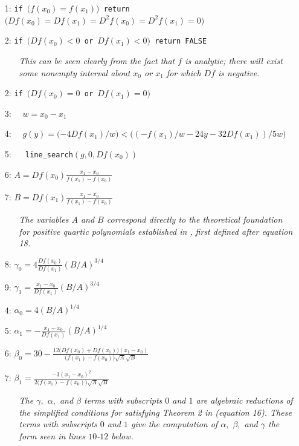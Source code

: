 \documentclass{scspaperproc}
\theoremstyle{scsthe}
\begin{document}
\begin{itemize}
  \itemsep0pt
  \parskip0pt

\item[1:] \texttt{if $\big(f(x_0) = f(x_1)\big)$ return $\big( Df(x_0) = Df(x_1) = D^2f(x_0) = D^2f(x_1) = 0 \big)$}
\item[2:] \texttt{if $\big(Df(x_0) < 0$ or $Df(x_1) < 0\big)$ return FALSE}
  \begin{itemize}
    \item[] \textit{This can be seen clearly from the fact that $f$ is analytic; there will exist some nonempty interval about $x_0$ or $x_1$ for which $Df$ is negative.}
  \end{itemize}


\item[2:] \texttt{if $\big(Df(x_0) = 0$ or $Df(x_1) = 0\big)$}
\item[3:] $\quad w = x_0 - x_1$
\item[4:] $\quad g(y) = \big({-4} Df(x_1) / w \big) < \big( ({-f}(x_1)/w - 24 y - 32 Df(x_1)) / 5w \big)$
\item[5:] $\quad$ \texttt{line\_search}$(g, 0, Df(x_0))$
\item[6:] $A = Df(x_0)\frac{x_1 - x_0}{f(x_1) - f(x_0)}$
\item[7:] $B = Df(x_1) \frac{x_1 - x_0}{f(x_1) - f(x_0)}$
  \begin{itemize}
    \item[] \textit{The variables $A$ and $B$ correspond directly to the theoretical foundation for positive quartic polynomials established in \cite{ulrich1994positivity}, first defined after equation 18.}
  \end{itemize}
\item[8:] $\gamma_0 = 4 \frac{Df(x_0)}{Df(x_1)} (B/A)^{3/4}$
\item[9:] $\gamma_1 = \frac{x_1 - x_0}{Df(x_1)} (B/A)^{3/4}$
\item[4:] $\alpha_0 = 4 (B/A)^{1/4}$
\item[5:] $\alpha_1 = -\frac{x_1 - x_0}{Df(x_1)} (B/A)^{1/4}$
\item[6:] $\beta_0 = 30 - \frac{12 \big(Df(x_0) + Df(x_1)\big) (x_1 - x_0)}{\big(f(x_1) - f(x_0)\big) \sqrt{A}\sqrt{B}}$
\item[7:] $\beta_1 = \frac{-3 (x_1 - x_0)^2}{2 \big(f(x_1) - f(x_0)\big) \sqrt{A} \sqrt{B}} $
  \begin{itemize}
    \item[] \textit{The $\gamma,$ $\alpha,$ and $\beta$ terms with subscripts $0$ and $1$ are algebraic reductions of the simplified conditions for satisfying Theorem 2 in \cite{ulrich1994positivity} (equation 16). These terms with subscripts $0$ and $1$ give the computation of $\alpha,$ $\beta,$ and $\gamma$ the form seen in lines $10$-$12$ below.}

\end{itemize}
\end{itemize}
\end{document}
